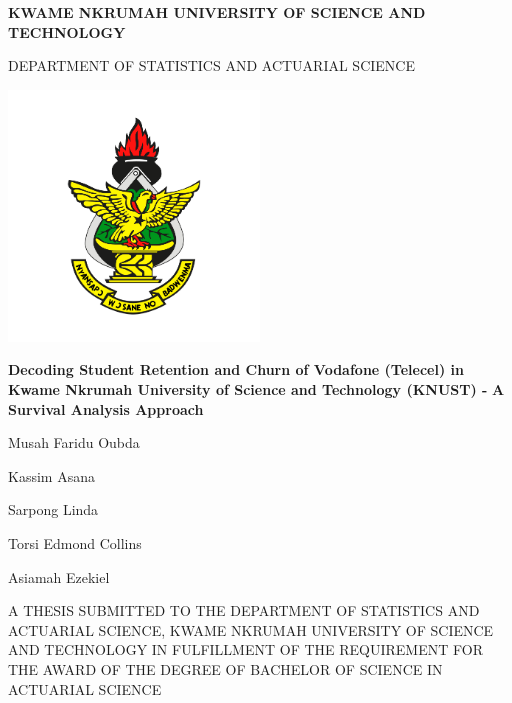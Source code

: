 \documentclass[doublespacing]{report} %
\begin{document}
\begin{titlepage}
\centering
    \vspace{0.2cm}
    \Large\textbf{KWAME NKRUMAH UNIVERSITY OF SCIENCE AND TECHNOLOGY}
    
      \vspace{0.2cm}
   \large{DEPARTMENT OF STATISTICS AND ACTUARIAL SCIENCE}
    \vspace{0.4cm}
    
     \begin{center}
\includegraphics[width=0.5\textwidth]{logo.png}\end{center}

    \large{\textbf{Decoding Student Retention and Churn of
Vodafone (Telecel) in Kwame Nkrumah University
of Science and Technology (KNUST) - }}
\vspace{0.2cm}
   \large{\textbf{A Survival Analysis Approach}}
    \vspace{0.4cm}
    
\large{Musah Faridu Oubda

Kassim Asana

Sarpong Linda

Torsi Edmond Collins

Asiamah Ezekiel}

    \vspace{0.8cm}  
    \small{A THESIS SUBMITTED TO THE DEPARTMENT OF STATISTICS AND ACTUARIAL SCIENCE, KWAME NKRUMAH UNIVERSITY OF SCIENCE AND TECHNOLOGY IN FULFILLMENT OF THE REQUIREMENT FOR THE AWARD OF THE DEGREE OF BACHELOR OF SCIENCE IN ACTUARIAL SCIENCE}\\


\end{titlepage}

\end{document}
